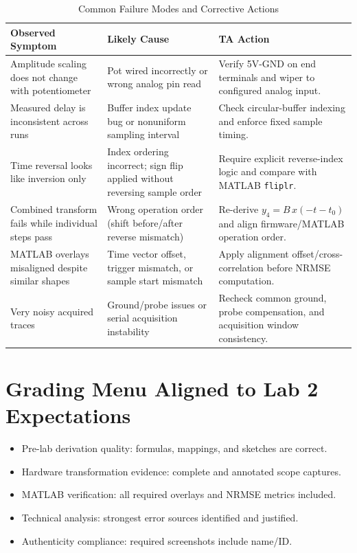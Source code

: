 \documentclass[11pt,letterpaper]{article}
\begin{document}
\begin{table}[h!]
\centering
\caption{Common Failure Modes and Corrective Actions}
\begin{tabular}{p{} p{} p{}}
\toprule
\textbf{Observed Symptom} & \textbf{Likely Cause} & \textbf{TA Action} \\
\midrule
Amplitude scaling does not change with potentiometer & Pot wired incorrectly or wrong analog pin read & Verify 5V-GND on end terminals and wiper to configured analog input. \\
Measured delay is inconsistent across runs & Buffer index update bug or nonuniform sampling interval & Check circular-buffer indexing and enforce fixed sample timing. \\
Time reversal looks like inversion only & Index ordering incorrect; sign flip applied without reversing sample order & Require explicit reverse-index logic and compare with MATLAB \texttt{fliplr}. \\
Combined transform fails while individual steps pass & Wrong operation order (shift before/after reverse mismatch) & Re-derive $y_4=B\,x(-t-t_0)$ and align firmware/MATLAB operation order. \\
MATLAB overlays misaligned despite similar shapes & Time vector offset, trigger mismatch, or sample start mismatch & Apply alignment offset/cross-correlation before NRMSE computation. \\
Very noisy acquired traces & Ground/probe issues or serial acquisition instability & Recheck common ground, probe compensation, and acquisition window consistency. \\
\bottomrule
\end{tabular}
\end{table}

\section{Grading Menu Aligned to Lab 2 Expectations}
\begin{itemize}[leftmargin=1.2em]
    \item Pre-lab derivation quality: formulas, mappings, and sketches are correct.
    \item Hardware transformation evidence: complete and annotated scope captures.
    \item MATLAB verification: all required overlays and NRMSE metrics included.
    \item Technical analysis: strongest error sources identified and justified.
    \item Authenticity compliance: required screenshots include name/ID.
\end{itemize}
\end{document}
